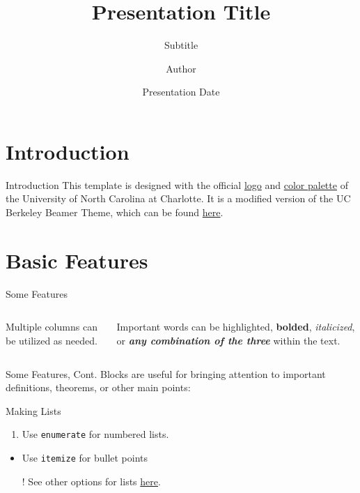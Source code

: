 \documentclass[10pt,xcolor={table,dvipsnames},t,unknownkeysallowed]{beamer}
\title{Presentation Title}
\subtitle{Subtitle}
\author{Author}
\institute{Department | Institution}
\date{Presentation Date}
\begin{document}
\begin{frame}
  \titlepage
\end{frame}

\section{Introduction}

\begin{frame}{Introduction}
This template is designed with the official \href{https://brand.charlotte.edu/visual-identity/logo-system}{logo} and \href{https://brand.charlotte.edu/visual-identity/color-palette}{color palette} of the University of North Carolina at Charlotte.
\newline
\newline
It is a modified version of the UC Berkeley Beamer Theme, which can be found \href{https://www.overleaf.com/latex/templates/uc-berkeley-beamer-theme/bywswngntrws}{here}. 
\end{frame}

\section {Basic Features}

\begin{frame}{Some Features}
\begin{columns}[T]
    \begin{column}{0.48\textwidth}
        Multiple columns can be utilized as needed.
    \end{column}

    \begin{column}{0.48\textwidth}
Important words can be \alert{highlighted}, \textbf{bolded}, \emph{italicized}, or \alert{\emph{\textbf{any combination of the three}}} within the text. 
    \end{column}
\end{columns}
\end{frame}

\begin{frame}{Some Features, Cont.}
Blocks are useful for bringing attention to important definitions, theorems, or other main points:
\newline
    \begin{block}{Making Lists}
        \begin{enumerate}
            \item Use \texttt{enumerate} for numbered lists.
        \end{enumerate}
        \begin{itemize}
            \item Use \texttt{itemize} for bullet points
            \item[!] See other options for lists \href{https://www.overleaf.com/learn/latex/Lists}{here}.
        \end{itemize}
    \end{block}
\end{frame}
\end{document}
